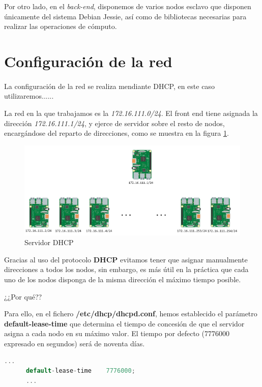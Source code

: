 Por otro lado, en el \textit{back-end}, disponemos de varios nodos esclavo que disponen únicamente del sistema Debian Jessie, así como de bibliotecas necesarias para realizar las operaciones de cómputo.

\section{Configuración de la red}
\label{makereference3.4}
\paragraph{}

La configuración de la red se realiza mendiante DHCP, en este caso utilizaremos......

La red en la que trabajamos es la \textit{172.16.111.0/24}. El front end tiene asignada la dirección \textit{172.16.111.1/24}, y ejerce de servidor sobre el resto de nodos, encargándose del reparto de direcciones, como se muestra en la figura \ref{figure3.3}.

\begin{figure}[H]
	\centering
  	\includegraphics[width=120mm]{pics/dhcpdos.png}
   	\caption[Servidor DHCP]{Servidor DHCP}
   \label{figure3.3}
\end{figure}

Gracias al uso del protocolo \textbf{DHCP} evitamos tener que asignar manualmente direcciones a todos los nodos, sin embargo, es más útil en la práctica que cada uno de los nodos disponga de la misma dirección el máximo tiempo posible.

¿¿Por qué??

Para ello, en el fichero \textbf{/etc/dhcp/dhcpd.conf}, hemos establecido el parámetro \textbf{default-lease-time} que determina el tiempo de concesión de que el servidor asigna a cada nodo en su máximo valor. El tiempo por defecto (7776000 expresado en segundos) será de noventa días.

\begin{lstlisting}[language=c,frame=single,numbers=none]
      ...
      default-lease-time	7776000;
      ...
\end{lstlisting}

